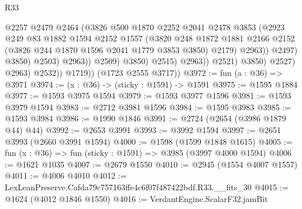 \begin{lexlean}{R33}
\begin{coremodule}
                                          @2257
                                          @2479
                                          @2464
                                          (@3826
                                            @500
                                            @1870
                                            @2252
                                            @2041
                                            @2478
                                            @3853
                                            (@2923
                                              @249
                                              @83
                                              @1882
                                              @1594
                                              @2152
                                              @1557
                                              (@3820
                                                @248
                                                @1872
                                                @1881
                                                @2166
                                                @2152
                                                (@3826 @244 @1870 @1596 @2041 @1779 @3853 @3850)
                                                @2179)
                                              @2963))
                                          @2497)
                                        @3850)
                                      @2503)
                                    @2963))
                                @2509)
                              @3850)
                            @2515)
                          @2963))
                      @2521)
                    @3850)
                  @2527)
                @2963)
              @2532))
          @1719))
      (@1723 @2555 @3717))
@3972 := fun (a : @36) => @3971
@3974 := (x : @36) -> (sticky : @1591) -> @1591
@3975 := @1595 @1884
@3977 := @1593 @3975 @1594
@3979 := @1593 @3977 @1596
@3981 := @1593 @3979 @1594
@3983 := @2712 @3981 @1596
@3984 := @1595 @3983
@3985 := @1593 @3984
@3986 := @1990 @1846
@3991 := @2724 (@2654 (@3986 @1879 @44) @44)
@3992 := @2653 @3991
@3993 := @3992 @1594
@3997 := @2651 @3993 (@2660 @3991 @1594)
@4000 := @1598 (@1599 @1848 @1615)
@4005 := fun (x : @36) => fun (sticky : @1591) => @3985 (@3997 @4000 @1594)
@4006 := @1621 @1035
@4007 := @2679 @1550
@4010 := @2945 (@1554 @4007 @1557)
@4011 := @4006 @4010
@4012 := LexLeanPreserve.Cafda79c757163ffe4c6f07f487422bdf.R33.__fits_30
@4015 := @1624 (@4012 @1846 @1550)
@4016 := VerdantEngine.ScalarF32.jamBit

\end{coremodule}
\end{lexlean}
